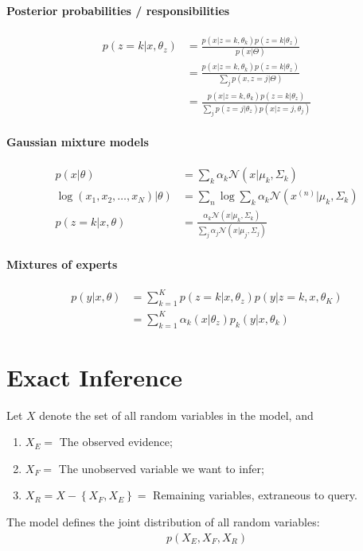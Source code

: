 \documentclass{article}
\begin{document}
	\paragraph{Posterior probabilities / responsibilities}
	\begin{align}
		p\left(z=k | x, \theta_{z}\right)
		&= \frac{p\left(x |z=k, \theta_k \right) p\left(z=k | \theta_{z}\right)
		}{p(x|\Theta)} \\
		&=\frac{p\left(x |z=k, \theta_k \right) p\left(z=k | \theta_{z}\right)
		}{\sum_{j} p(x, z = j | \Theta )} \\
		&=\frac{p\left(x |z=k, \theta_k \right) p\left(z=k | \theta_{z}\right)
		}{\sum_{j} p\left(z=j | \theta_{z}\right) p \left(x |z=j, \theta_{j}\right)}
	\end{align}
	
	\paragraph{Gaussian mixture models}
	\begin{align}
		p(x | \theta)&=\sum_{k} \alpha_{k} \mathcal{N}\left(x | \mu_{k}, \Sigma_{k}\right) \\
		\left.\log \left(x_{1}, x_{2}, \ldots, x_{N}\right) | \theta\right)&=\sum_{n} \log \sum_{k} \alpha_{k} \mathcal{N}(x^{(n)} | \mu_{k}, \Sigma_{k}) \\
		p(z=k | x, \theta)&=\frac{\alpha_{k} \mathcal{N}\left(x | \mu_{k}, \Sigma_{k}\right)}{\sum_{j} \alpha_{j} \mathcal{N}\left(x | \mu_{j}, \Sigma_{j}\right)}
	\end{align}
	
	\paragraph{Mixtures of experts}
	\begin{align}
		p(y | x, \theta) &= \sum_{k=1}^{K} p\left(z=k | x, \theta_{z}\right) p\left(y | z=k, x, \theta_{K}\right) \\
		&=\sum_{k=1}^K \alpha_{k}\left(x | \theta_{z}\right) p_{k}\left(y | x, \theta_{k}\right)
	\end{align}
	
	\section{Exact Inference}
	\begin{notation}
		Let $X$ denote the set of all random variables in the model, and
		\begin{enumerate}
			\item $X_{E}=$ The observed evidence;
			\item $X_{F}=$ The unobserved variable we want to infer;
			\item $X_{R}=X-\left\{X_{F}, X_{E}\right\}=$ Remaining variables, extraneous to query.
		\end{enumerate}
		The model defines the joint distribution of all random variables:
		\begin{align}
			p(X_E, X_F, X_R)
		\end{align}
	\end{notation}
	
\end{document}
